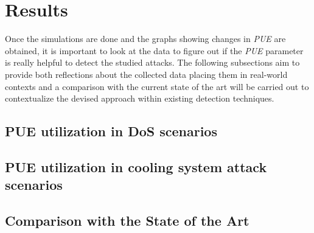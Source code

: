 \section{Results}
Once the simulations are done and the graphs showing changes in \emph{PUE} are obtained, it is important to look at the data to figure out if the \emph{PUE} parameter is really helpful to detect the studied attacks. The following subsections aim to provide both reflections about the collected data placing them in real-world contexts and a comparison with the current state of the art will be carried out to contextualize the devised approach within existing detection techniques.

\subsection{PUE utilization in DoS scenarios}

\subsection{PUE utilization in cooling system attack scenarios}

\subsection{Comparison with the State of the Art}

